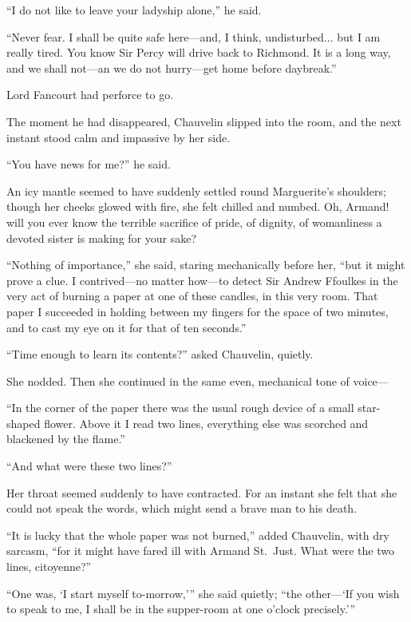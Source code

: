 \documentclass[paper=5.5in:8.5in,BCOR=7mm,twoside,DIV=calc,12pt,usegeometry,chapterprefix,endperiod,headings=big]{scrbook}
\begin{document}
\enquote{I do not like to leave your ladyship alone,} he said.

\enquote{Never fear. I shall be quite safe here---and, I think, undisturbed... but I am really tired. You know Sir Percy will drive back to Richmond. It is a long way, and we shall not---an we do not hurry---get home before daybreak.}

Lord Fancourt had perforce to go.

The moment he had disappeared, Chauvelin slipped into the room, and the next instant stood calm and impassive by her side.

\enquote{You have news for me?} he said.

An icy mantle seemed to have suddenly settled round Marguerite's shoulders; though her cheeks glowed with fire, she felt chilled and numbed. Oh, Armand! will you ever know the terrible sacrifice of pride, of dignity, of womanliness a devoted sister is making for your sake?

\enquote{Nothing of importance,} she said, staring mechanically before her, \enquote{but it might prove a clue. I contrived---no matter how---to detect Sir Andrew Ffoulkes in the very act of burning a paper at one of these candles, in this very room. That paper I succeeded in holding between my fingers for the space of two minutes, and to cast my eye on it for that of ten seconds.}

\enquote{Time enough to learn its contents?} asked Chauvelin, quietly.

She nodded. Then she continued in the same even, mechanical tone of voice---

\enquote{In the corner of the paper there was the usual rough device of a small star-shaped flower. Above it I read two lines, everything else was scorched and blackened by the flame.}

\enquote{And what were these two lines?}

Her throat seemed suddenly to have contracted. For an instant she felt that she could not speak the words, which might send a brave man to his death.

\enquote{It is lucky that the whole paper was not burned,} added Chauvelin, with dry sarcasm, \enquote{for it might have fared ill with Armand St.~Just. What were the two lines, citoyenne?}

\enquote{One was, \enquote{I start myself to-morrow,}} she said quietly; \enquote{the other---\enquote{If you wish to speak to me, I shall be in the supper-room at one o'clock precisely.}}
\end{document}

